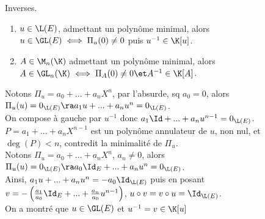 \documentclass[11pt]{article}
\begin{document}
\pagebreak

\begin{prop}{Inverses.}{}
    \begin{enumerate}
        \item $u\in\L(E)$, admettant un polynôme minimal, alors $u\in \GL(E)\iff \Pi_u(0)\neq0$ puis $u^{-1}\in\K[u]$.
        \item $A\in \M_n(\K)$ admettant un polynôme minimal, alors $A\in\GL_n(\K)\iff \Pi_A(0)\neq0 \et A^{-1}\in\K[A]$.
    \end{enumerate}
    \tcblower
     Notons $\Pi_u=a_0+...+a_nX^n$, par l'absurde, sq $a_0=0$, alors $\Pi_u(u)=0_{\L(E)}\ra a_1u + ... + a_nu^n=0_{\L(E)}$.\\
    On compose à gauche par $u^{-1}$ donc $a_1\Id+...+a_nu^{n-1}=0_{\L(E)}$. $P=a_1+...+a_nX^{n-1}$ est un polynôme annulateur de $u$, non nul, et $\deg(P)<n$, contredit la minimalité de $\Pi_u$.\\
     Notons $\Pi_u=a_0+...+a_nX^n$, $a_n\neq0$, alors $\Pi_u(u)=0_{\L(E)}\ra a_0\Id_E+...+a_nu^n=0_{\L(E)}$.\\
    Ainsi, $a_1u + ... + a_nu^n = -a_0\Id_{\L(E)}$ puis en posant $v=-\left( \frac{a_1}{a_0}\Id_E + ... + \frac{a_n}{a_0}u^{n-1} \right)$, $u\circ v= v \circ u = \Id_{\L(E)}$.\\
    On a montré que $u\in\GL(E)$ et $u^{-1}=v\in\K[u]$
\end{prop}

\vspace*{-0.5cm}
\end{document}
